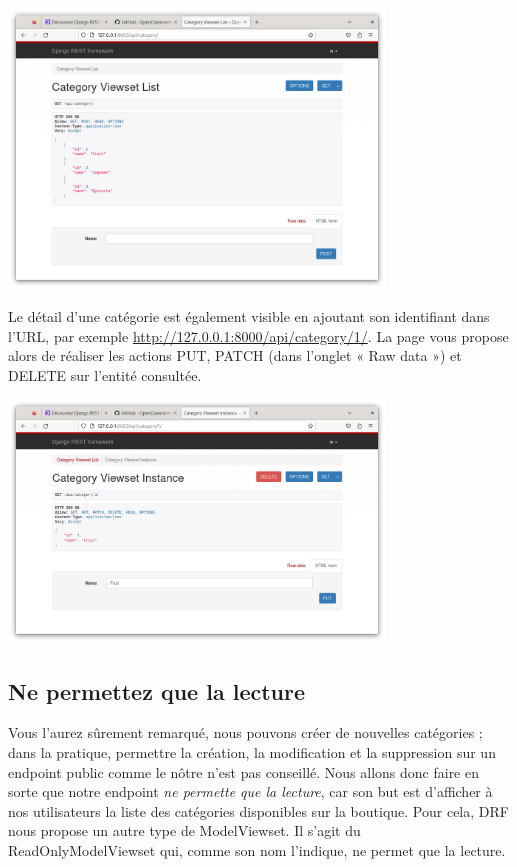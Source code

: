 \begin{center}
\includegraphics[width=10cm]{images/image06.png}
\end{center}
Le détail d’une catégorie est également visible en ajoutant son identifiant dans l’URL, par exemple \url{http://127.0.0.1:8000/api/category/1/}. La page vous propose alors de réaliser les actions {\color{monOrange}PUT, PATCH} (dans l’onglet « Raw data ») et {\color{monOrange}DELETE} sur l’entité consultée.
\begin{center}
\includegraphics[width=10cm]{images/image07.png}
\end{center}
\subsection{Ne permettez que la lecture}
Vous l’aurez sûrement remarqué, nous pouvons créer de nouvelles catégories ; dans la pratique, permettre la création, la modification et la suppression sur un endpoint public comme le nôtre n’est pas conseillé. Nous allons donc faire en sorte que notre endpoint {\em ne permette que la lecture}, car son but est d’afficher à nos utilisateurs la liste des catégories disponibles sur la boutique. Pour cela, DRF nous propose un autre type de {\color{monOrange}ModelViewset}. Il s’agit du {\color{monOrange}ReadOnlyModelViewset}  qui, comme son nom l’indique, ne permet que la lecture.

